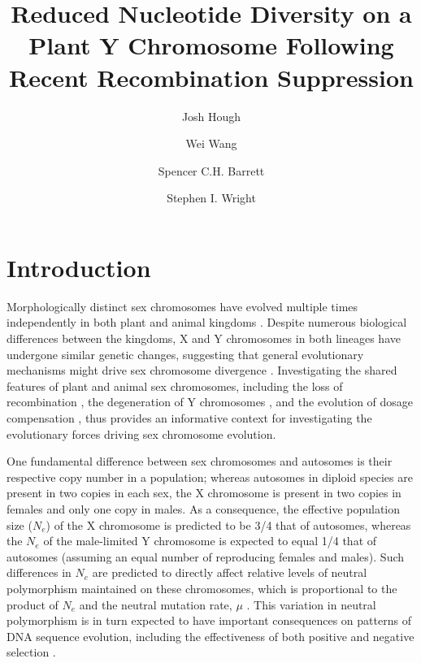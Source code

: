 \documentclass[9pt,twocolumn,twoside]{gsajnl}
\title{Reduced Nucleotide Diversity on a Plant Y Chromosome Following Recent Recombination Suppression}
\author[$\ast$,$\dagger$,1]{Josh Hough}
\author[$\dagger$]{Wei Wang}
\author[$\dagger$]{Spencer C.H. Barrett}
\author[$\dagger$]{Stephen I. Wright}
\affil[$\ast$]{Department of Plant Sciences, University of California, Davis}
\affil[$\dagger$]{Department of Ecology and Evolutionary Biology, University of Toronto}
\begin{document}
\maketitle
\thispagestyle{firststyle}
\marginmark
\firstpagefootnote
{}
\vspace{-11pt}

\section*{Introduction}

\lettrine[lines=2]{\color{color2}M}{}orphologically distinct sex chromosomes have evolved multiple times independently in both plant and animal kingdoms \citep{westergaard1958,ohno1967,bull1983,charlesworth1991}. Despite numerous biological differences between the kingdoms, X and Y chromosomes in both lineages have undergone similar genetic changes, suggesting that general evolutionary mechanisms might drive sex chromosome divergence \citep{charlesworth1978,charlesworth1996CB,charlesworth2000degeneration}. Investigating the shared features of plant and animal sex chromosomes, including the loss of recombination \citep{bergero2009}, the degeneration of Y chromosomes \citep{hough2014,bergero2015}, and the evolution of dosage compensation \citep{muyle2012,papadopulos2015}, thus provides an informative context for investigating the evolutionary forces driving sex chromosome evolution.

One fundamental difference between sex chromosomes and autosomes is their respective copy number in a population; whereas autosomes in diploid species are present in two copies in each sex, the X chromosome is present in two copies in females and only one copy in males. As a consequence, the effective population size ($N_{e}$) of the X chromosome is predicted to be 3/4 that of autosomes, whereas the $N_{e}$ of the male-limited Y chromosome is expected to equal 1/4 that of autosomes (assuming an equal number of reproducing females and males). Such differences in $N_{e}$ are predicted to directly affect relative levels of neutral polymorphism maintained on these chromosomes, which is proportional to the product of $N_{e}$ and the neutral mutation rate, $\mu$ \citep{Kimura1984}. This variation in neutral polymorphism is in turn expected to have important consequences on patterns of DNA sequence evolution, including the effectiveness of both positive and negative selection \citep{charlesworth1987}.
\end{document}

